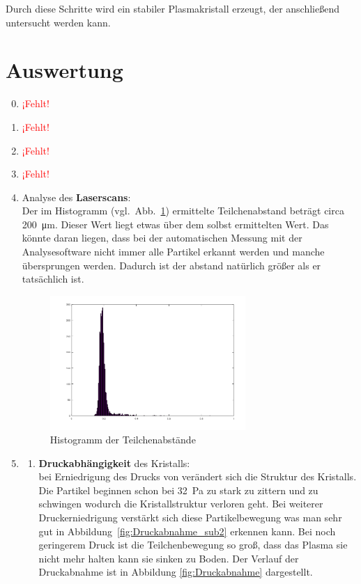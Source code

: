 \documentclass[12pt,a4paper,ngerman]{article}
\providecommand{\fehlt}{\textcolor{red}{{ ¡Fehlt! }}}
\begin{document}
Durch diese Schritte wird ein stabiler Plasmakristall erzeugt, der anschließend untersucht werden kann.	


\section{Auswertung}
	
	\begin{enumerate}[font=\bfseries]
		\setcounter{enumi}{-1}
		\item \fehlt
		\item \fehlt
		\item \fehlt
		\item \fehlt
		\item Analyse des \textbf{Laserscans}:\\
			Der im Histogramm (vgl.~Abb.~\ref{fig:histo}) ermittelte Teilchenabstand beträgt circa \qty{200}{\micro\meter}. Dieser Wert liegt etwas über dem solbst ermittelten Wert. Das könnte daran liegen, dass bei der automatischen Messung mit der Analysesoftware nicht immer alle Partikel erkannt werden und manche übersprungen werden. Dadurch ist der abstand natürlich größer als er tatsächlich ist.
			\begin{figure}[ht]
				\centering
				\includegraphics[width=0.7\textwidth]{data/histo.png}
				\caption{Histogramm der Teilchenabstände}
				\label{fig:histo}
			\end{figure}
		\item \begin{enumerate}[font=\bfseries, label=\alph*)]
			\item \textbf{Druckabhängigkeit} des Kristalls: \\
			bei Erniedrigung des Drucks von verändert sich die Struktur des Kristalls. Die Partikel beginnen schon bei \qty{32}{\pascal} zu stark zu zittern und zu schwingen wodurch die Kristallstruktur verloren geht. Bei weiterer Druckerniedrigung verstärkt sich diese Partikelbewegung was man sehr gut in Abbildung~\ref{fig:Druckabnahme_sub2} erkennen kann. Bei noch geringerem Druck ist die Teilchenbewegung so groß, dass das Plasma sie nicht mehr halten kann sie sinken zu Boden. Der Verlauf der Druckabnahme ist in Abbildung \ref{fig:Druckabnahme} dargestellt. 
			

\end{enumerate}
\end{enumerate}
\end{document}
